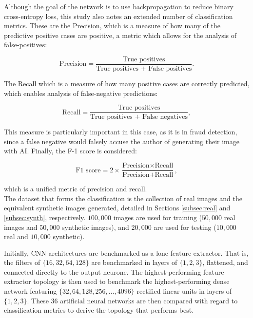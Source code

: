 \documentclass{article}
\begin{document}
Although the goal of the network is to use backpropagation to reduce binary cross-entropy loss, this study also notes an extended number of classification metrics. These are the Precision, which is a measure of how many of the predictive positive cases are positive, a metric which allows for the analysis of false-positives:

\begin{equation}
\text{Precision} = \frac{\text{True positives}}{\text{True positives + False positives}}.
\end{equation}

\noindent The Recall which is a measure of how many positive cases are correctly predicted, which enables analysis of false-negative predictions:

\begin{equation}
    \text{Recall} = \frac{\text{True positives}}{\text{True positives + False negatives}},
\end{equation}

\noindent This measure is particularly important in this case, as it is in fraud detection, since a false negative would falsely accuse the author of generating their image with AI. Finally, the F-1 score is considered:

\begin{equation}
    \text{F1 score} = 2 \times \frac{\text{Precision} \times \text{Recall}}{\text{Precision} + \text{Recall}},
\end{equation}

\noindent which is a unified metric of precision and recall. \\

The dataset that forms the classification is the collection of real images and the equivalent synthetic images generated, detailed in Sections \ref{subsec:real} and \ref{subsec:synth}, respectively. $100,000$ images are used for training ($50,000$ real images and $50,000$ synthetic images), and $20,000$ are used for testing ($10,000$ real and $10,000$ synthetic).

Initially, CNN architectures are benchmarked as a lone feature extractor. That is, the filters of $\{16,32,64,128\}$ are benchmarked in layers of $\{1,2,3\}$, flattened, and connected directly to the output neurone. The highest-performing feature extractor topology is then used to benchmark the highest-performing dense network featuring $\{32,64,128,256,...,4096\}$ rectified linear units in layers of $\{1,2,3\}$. These 36 artificial neural networks are then compared with regard to classification metrics to derive the topology that performs best. 
\end{document}
